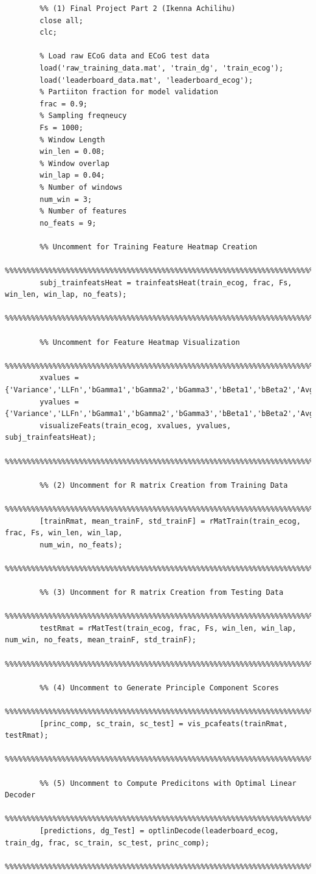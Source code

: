\documentclass{article}
\begin{document}
	\begin{lstlisting}
		%% (1) Final Project Part 2 (Ikenna Achilihu)
		close all;
		clc;

		% Load raw ECoG data and ECoG test data
		load('raw_training_data.mat', 'train_dg', 'train_ecog');
		load('leaderboard_data.mat', 'leaderboard_ecog');
		% Partiiton fraction for model validation
		frac = 0.9;
		% Sampling freqneucy
		Fs = 1000;
		% Window Length
		win_len = 0.08;
		% Window overlap
		win_lap = 0.04;
		% Number of windows
		num_win = 3;
		% Number of features
		no_feats = 9;

		%% Uncomment for Training Feature Heatmap Creation
		%%%%%%%%%%%%%%%%%%%%%%%%%%%%%%%%%%%%%%%%%%%%%%%%%%%%%%%%%%%%%%%%%%%%%%%%%%%
		subj_trainfeatsHeat = trainfeatsHeat(train_ecog, frac, Fs, win_len, win_lap, no_feats);
		%%%%%%%%%%%%%%%%%%%%%%%%%%%%%%%%%%%%%%%%%%%%%%%%%%%%%%%%%%%%%%%%%%%%%%%%%%%

		%% Uncomment for Feature Heatmap Visualization
		%%%%%%%%%%%%%%%%%%%%%%%%%%%%%%%%%%%%%%%%%%%%%%%%%%%%%%%%%%%%%%%%%%%%%%%%%%%
		xvalues = {'Variance','LLFn','bGamma1','bGamma2','bGamma3','bBeta1','bBeta2','Avg','Haart'};
		yvalues = {'Variance','LLFn','bGamma1','bGamma2','bGamma3','bBeta1','bBeta2','Avg','Haart'};
		visualizeFeats(train_ecog, xvalues, yvalues, subj_trainfeatsHeat);
		%%%%%%%%%%%%%%%%%%%%%%%%%%%%%%%%%%%%%%%%%%%%%%%%%%%%%%%%%%%%%%%%%%%%%%%%%%%

		%% (2) Uncomment for R matrix Creation from Training Data
		%%%%%%%%%%%%%%%%%%%%%%%%%%%%%%%%%%%%%%%%%%%%%%%%%%%%%%%%%%%%%%%%%%%%%%%%%%%
		[trainRmat, mean_trainF, std_trainF] = rMatTrain(train_ecog, frac, Fs, win_len, win_lap, 
		num_win, no_feats);
		%%%%%%%%%%%%%%%%%%%%%%%%%%%%%%%%%%%%%%%%%%%%%%%%%%%%%%%%%%%%%%%%%%%%%%%%%%%

		%% (3) Uncomment for R matrix Creation from Testing Data
		%%%%%%%%%%%%%%%%%%%%%%%%%%%%%%%%%%%%%%%%%%%%%%%%%%%%%%%%%%%%%%%%%%%%%%%%%%%
		testRmat = rMatTest(train_ecog, frac, Fs, win_len, win_lap, num_win, no_feats, mean_trainF, std_trainF);
		%%%%%%%%%%%%%%%%%%%%%%%%%%%%%%%%%%%%%%%%%%%%%%%%%%%%%%%%%%%%%%%%%%%%%%%%%%%

		%% (4) Uncomment to Generate Principle Component Scores
		%%%%%%%%%%%%%%%%%%%%%%%%%%%%%%%%%%%%%%%%%%%%%%%%%%%%%%%%%%%%%%%%%%%%%%%%%%%
		[princ_comp, sc_train, sc_test] = vis_pcafeats(trainRmat, testRmat);
		%%%%%%%%%%%%%%%%%%%%%%%%%%%%%%%%%%%%%%%%%%%%%%%%%%%%%%%%%%%%%%%%%%%%%%%%%%%

		%% (5) Uncomment to Compute Predicitons with Optimal Linear Decoder
		%%%%%%%%%%%%%%%%%%%%%%%%%%%%%%%%%%%%%%%%%%%%%%%%%%%%%%%%%%%%%%%%%%%%%%%%%%%
		[predictions, dg_Test] = optlinDecode(leaderboard_ecog, train_dg, frac, sc_train, sc_test, princ_comp);
		%%%%%%%%%%%%%%%%%%%%%%%%%%%%%%%%%%%%%%%%%%%%%%%%%%%%%%%%%%%%%%%%%%%%%%%%%%%


\end{lstlisting}
\end{document}
